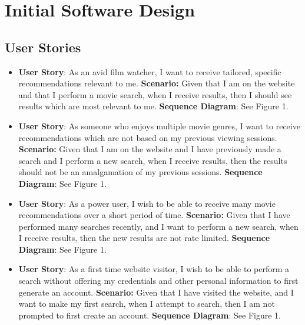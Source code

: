 \documentclass{article}
\begin{document}
\section{Initial Software Design}
\subsection{User Stories}
\begin{itemize}
\item \textbf{User Story}: As an avid film watcher, I want to receive 
tailored, specific recommendations relevant to me.
\newline \textbf {Scenario:} Given that I am on the website and that I perform a movie search, when I receive results, then I should see results which are most relevant to me.
\newline\textbf{Sequence Diagram}: See Figure 1.

\item \textbf{User Story}: As someone who enjoys multiple movie genres, I want
to receive recommendations which are not based on my previous viewing sessions.
\newline \textbf {Scenario:} Given that I am on the website and I have previously made a search and I 
perform a new search, when I receive results, then the results should not be
an amalgamation of my previous sessions.
\newline\textbf{Sequence Diagram}: See Figure 1.

\item \textbf{User Story}: As a power user, I wish to be able to receive many 
movie recommendations over a short period of time.
\newline \textbf {Scenario:} Given that I have performed many searches recently, and I want to perform a new search, when I receive results, then the new results are not rate limited.
\newline\textbf{Sequence Diagram}: See Figure 1.

\item \textbf{User Story}: As a first time website visitor, I wish to be able 
to perform a search without offering my credentials and other personal
information to first generate an account.
\newline \textbf {Scenario:} Given that I have visited the website, and I want to make my first search, when I attempt to search, then I am not prompted to first create an account.
\newline\textbf{Sequence Diagram}: See Figure 1.


\end{itemize}
\end{document}
